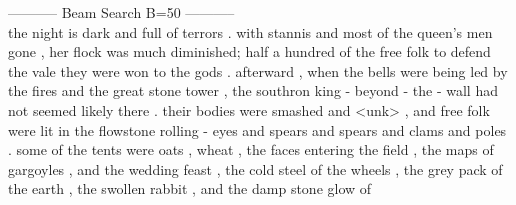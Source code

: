 \documentclass[12pt,article]{article}
\begin{document}
----------- Beam Search B=50 ----------- \\
the night is dark and full of terrors . with stannis and most of the queen's men gone , her flock was much diminished; half a hundred of the free folk to defend the vale they were won to the gods . afterward , when the bells were being led by the fires and the great stone tower , the southron king - beyond - the - wall had not seemed likely there . their bodies were smashed and <unk> , and free folk were lit in the flowstone rolling - eyes and spears and spears and clams and poles . some of the tents were oats , wheat , the faces entering the field , the maps of gargoyles , and the wedding feast , the cold steel of the wheels , the grey pack of the earth , the swollen rabbit , and the damp stone glow of


\end{document}
